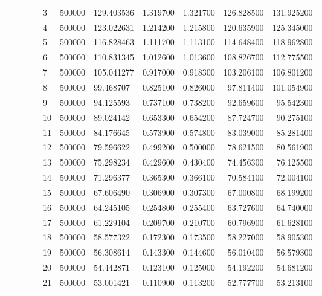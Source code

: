\begin{tabular}{lllllllrrrr}
\cline{5-11}
 &  &  &  & 3 & 500000 & 129.403536 & 1.319700 & 1.321700 & 126.828500 & 131.925200 \\
\cline{5-11}
 &  &  &  & 4 & 500000 & 123.022631 & 1.214200 & 1.215800 & 120.635900 & 125.345000 \\
\cline{5-11}
 &  &  &  & 5 & 500000 & 116.828463 & 1.111700 & 1.113100 & 114.648400 & 118.962800 \\
\cline{5-11}
 &  &  &  & 6 & 500000 & 110.831345 & 1.012600 & 1.013600 & 108.826700 & 112.775500 \\
\cline{5-11}
 &  &  &  & 7 & 500000 & 105.041277 & 0.917000 & 0.918300 & 103.206100 & 106.801200 \\
\cline{5-11}
 &  &  &  & 8 & 500000 & 99.468707 & 0.825100 & 0.826000 & 97.811400 & 101.054900 \\
\cline{5-11}
 &  &  &  & 9 & 500000 & 94.125593 & 0.737100 & 0.738200 & 92.659600 & 95.542300 \\
\cline{5-11}
 &  &  &  & 10 & 500000 & 89.024142 & 0.653300 & 0.654200 & 87.724700 & 90.275100 \\
\cline{5-11}
 &  &  &  & 11 & 500000 & 84.176645 & 0.573900 & 0.574800 & 83.039000 & 85.281400 \\
\cline{5-11}
 &  &  &  & 12 & 500000 & 79.596622 & 0.499200 & 0.500000 & 78.621500 & 80.561900 \\
\cline{5-11}
 &  &  &  & 13 & 500000 & 75.298234 & 0.429600 & 0.430400 & 74.456300 & 76.125500 \\
\cline{5-11}
 &  &  &  & 14 & 500000 & 71.296377 & 0.365300 & 0.366100 & 70.584100 & 72.004100 \\
\cline{5-11}
 &  &  &  & 15 & 500000 & 67.606490 & 0.306900 & 0.307300 & 67.000800 & 68.199200 \\
\cline{5-11}
 &  &  &  & 16 & 500000 & 64.245105 & 0.254800 & 0.255400 & 63.727600 & 64.740000 \\
\cline{5-11}
 &  &  &  & 17 & 500000 & 61.229104 & 0.209700 & 0.210700 & 60.796900 & 61.628100 \\
\cline{5-11}
 &  &  &  & 18 & 500000 & 58.577322 & 0.172300 & 0.173500 & 58.227000 & 58.905300 \\
\cline{5-11}
 &  &  &  & 19 & 500000 & 56.308614 & 0.143300 & 0.144600 & 56.010400 & 56.579300 \\
\cline{5-11}
 &  &  &  & 20 & 500000 & 54.442871 & 0.123100 & 0.125000 & 54.192200 & 54.681200 \\
\cline{5-11}
 &  &  &  & 21 & 500000 & 53.001421 & 0.110900 & 0.113200 & 52.777700 & 53.213100 \\

\end{tabular}
